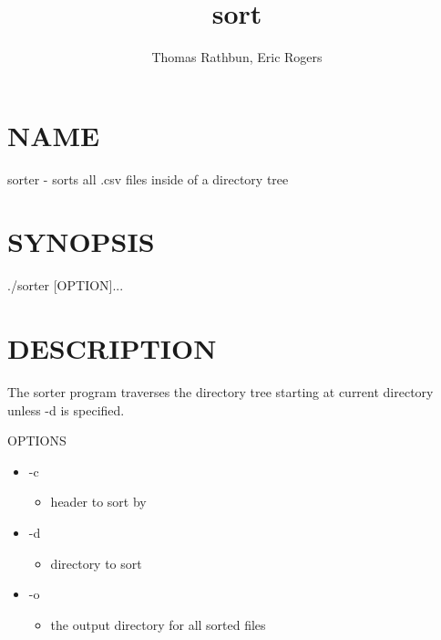 \documentclass{article}
\title{sort}
\author{Thomas Rathbun, Eric Rogers}
\date{}
\begin{document}
\begin{titlepage}
\maketitle
\end{titlepage}

\section{NAME}
\begin{center}
sorter - sorts all .csv files inside of a directory tree  
\end{center}

\section{SYNOPSIS}
\begin{center} 
./sorter [OPTION]... 
\end{center}

\section{DESCRIPTION}
\begin{center} 
The sorter program traverses the directory tree starting at current
directory unless -d is specified.

OPTIONS
\begin{itemize}
\item -c
\begin{itemize}
\item header to sort by
\end{itemize}
\item -d
\begin{itemize}
\item directory to sort
\end{itemize}
\item -o
\begin{itemize}
\item the output directory for all sorted files
\end{itemize}
\end{itemize}
\end{center}
\end{document}

